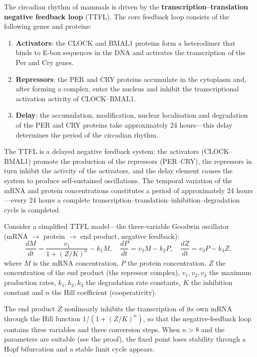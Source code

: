 \begin{definition}\label{def:circadian_rhythm}
The circadian rhythm of mammals is driven by the \textbf{transcription--translation negative feedback loop} (TTFL). The core feedback loop consists of the following genes and proteins:
\begin{enumerate}[label=(\roman*)]
    \item \textbf{Activators}: the CLOCK and BMAL1 proteins form a heterodimer that binds to E-box sequences in the DNA and activates the transcription of the Per and Cry genes.
    \item \textbf{Repressors}: the PER and CRY proteins accumulate in the cytoplasm and, after forming a complex, enter the nucleus and inhibit the transcriptional activation activity of CLOCK--BMAL1.
    \item \textbf{Delay}: the accumulation, modification, nuclear localisation and degradation of the PER and CRY proteins take approximately 24 hours---this delay determines the period of the circadian rhythm.
\end{enumerate}
The TTFL is a delayed negative feedback system: the activators (CLOCK--BMAL1) promote the production of the repressors (PER--CRY), the repressors in turn inhibit the activity of the activators, and the delay element causes the system to produce self-sustained oscillations. The temporal variation of the mRNA and protein concentrations constitutes a period of approximately 24 hours---every 24 hours a complete transcription--translation--inhibition--degradation cycle is completed.
\end{definition}

\begin{proposition}\label{prop:circadian_model}
Consider a simplified TTFL model---the three-variable Goodwin oscillator (mRNA $\to$ protein $\to$ end product, negative feedback):
\[
\frac{dM}{dt} = \frac{v_1}{1 + (Z/K)^n} - k_1 M, \quad \frac{dP}{dt} = v_2 M - k_2 P, \quad \frac{dZ}{dt} = v_3 P - k_3 Z,
\]
where $M$ is the mRNA concentration, $P$ the protein concentration, $Z$ the concentration of the end product (the repressor complex), $v_1, v_2, v_3$ the maximum production rates, $k_1, k_2, k_3$ the degradation rate constants, $K$ the inhibition constant and $n$ the Hill coefficient (cooperativity).

The end product $Z$ nonlinearly inhibits the transcription of its own mRNA through the Hill function $1/(1+(Z/K)^n)$, so that the negative-feedback loop contains three variables and three conversion steps. When $n > 8$ and the parameters are suitable (see the proof), the fixed point loses stability through a Hopf bifurcation and a stable limit cycle appears.
\end{proposition}

